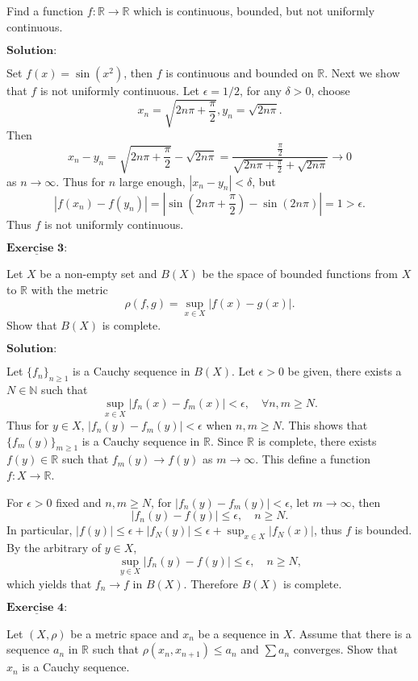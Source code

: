 \documentclass[12pt,a4paper]{ctexart}
\begin{document}
Find a function $f: \mathbb R \to \mathbb R$ which is continuous, bounded, but not uniformly continuous.
 
\vspace{8pt}
$\textbf{Solution:}$

Set $f(x) = \sin(x^2)$, then $f$ is continuous and bounded on $\mathbb R$. Next we show that $f$ is not uniformly continuous. Let $\epsilon = 1/2$, for any $\delta > 0$, choose
$$x_n = \sqrt{2n \pi + \frac{\pi}{2}}, y_n = \sqrt{2n \pi}.$$
Then 
$$x_n - y_n = \sqrt{2n \pi + \frac{\pi}{2}} - \sqrt{2n \pi} = \frac{\frac{\pi}{2}}{\sqrt{2n \pi + \frac{\pi}{2}} + \sqrt{2n \pi}} \to 0$$
as $n \to \infty$. Thus for $n$ large enough, $|x_n - y_n| < \delta$, but
$$|f(x_n) - f(y_n)| = |\sin (2n \pi + \frac{\pi}{2}) - \sin (2n \pi)| = 1 > \epsilon.$$
Thus $f$ is not uniformly continuous.



\newpage

$\underline{\textbf{Exercise 3:}}$

Let $X$ be a non-empty set and $B(X)$ be the space of bounded functions from $X$ to $\mathbb R$ with the metric
$$\rho(f, g) = \sup_{x \in X} |f(x) - g(x)|.$$
Show that $B(X)$ is complete.
 
\vspace{8pt}
$\textbf{Solution:}$

Let $\{f_n\}_{n \geq 1}$ is a Cauchy sequence in $B(X)$. Let $\epsilon > 0$ be given, there exists a $N \in \mathbb N$ such that
$$\sup_{x \in X} |f_n(x) - f_m(x)| < \epsilon, \quad \forall n, m \geq N.$$
Thus for $y \in X$, $|f_n(y) - f_m(y)| < \epsilon$ when $n, m \geq N$. This shows that $\{f_m(y) \}_{m \geq 1}$ is a Cauchy sequence in $\mathbb R$. Since $\mathbb R$ is complete, there exists $f(y) \in \mathbb R$ such that $f_m(y) \to f(y)$ as $m \to \infty$. This define a function $f: X \to \mathbb R$.

For $\epsilon > 0$ fixed and $n, m \geq N$, for $|f_n(y) - f_m(y)| < \epsilon$, let $m \to \infty$, then
$$|f_n(y) - f(y)| \leq \epsilon, \quad n \geq N.$$
In particular, $|f(y)| \leq \epsilon + |f_{N}(y)| \leq \epsilon + \sup_{x \in X} |f_N(x)|$, thus $f$ is bounded. By the arbitrary of $y \in X$,
$$\sup_{y \in X} |f_n(y) - f(y)| \leq \epsilon, \quad n \geq N,$$
which yields that $f_n \to f$ in $B(X)$. Therefore $B(X)$ is complete.



\newpage

$\underline{\textbf{Exercise 4:}}$ 

Let $(X, \rho)$ be a metric space and $x_n$ be a sequence in $X$. Assume that there is a sequence $a_n$ in $\mathbb R$ such that $\rho(x_n, x_{n+1}) \leq a_n$ and $\sum a_n$ converges. Show that $x_n$ is a Cauchy sequence.
\end{document}
